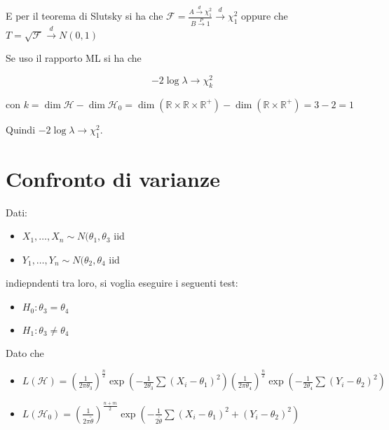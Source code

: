 \documentclass[hidelinks, 10pt]{report}
\begin{document}
\begin{es}
E per il teorema di Slutsky si ha che $ \mathcal{F} = \frac{A \stackrel{d}{\to} \chi^{2}_{1}}{B \stackrel{P}{\to} 1} \stackrel{d}{\to} \chi^{2}_{1} $ oppure che $ T = \sqrt{\mathcal{F}} \stackrel{d}{\to} N(0,1) $

Se uso il rapporto ML si ha che

\[ -2 \log \lambda \to \chi^{2}_{k} \]

con $ k = \dim \mathcal{H} - \dim \mathcal{H_{0}} = \dim (\mathbb{R} \times \mathbb{R} \times \mathbb{R}^{+}) - \dim (\mathbb{R} \times \mathbb{R}^{+}) = 3 - 2 = 1 $

Quindi $ - 2 \log \lambda \to \chi^{2}_{1} $.
\end{es}

\section{Confronto di varianze}

Dati:

\begin{itemize}
\item $ X_{1}, \dotsc, X_{n} \sim N(\theta_{1}, \theta_{3} $ iid
\item $ Y_{1}, \dotsc, Y_{n} \sim N(\theta_{2}, \theta_{4} $ iid
\end{itemize}

indiepndenti tra loro, si voglia eseguire i seguenti test:
\begin{itemize}
\item $ H_{0}: \theta_{3} = \theta_{4} $
\item $ H_{1}: \theta_{3} \ne \theta_{4} $
\end{itemize}

Dato che
\begin{itemize}
\item $ L(\mathcal{H}) = \left( \frac{1}{2 \pi \theta_{3}} \right)^{\frac{n}{2}} \exp \left( - \frac{1}{2 \theta_{3}} \sum (X_{i} - \theta_{1})^{2} \right) \left( \frac{1}{2 \pi \theta_{4}} \right)^{\frac{n}{2}} \exp \left( - \frac{1}{2 \theta_{4}} \sum (Y_{i} - \theta_{2})^{2} \right) $
\item $ L(\mathcal{H}_{0}) = \left( \frac{1}{2 \pi \tilde{\theta}} \right)^{\frac{n + m}{2}} \exp \left( - \frac{1}{2 \tilde{\theta}} \sum (X_{i} - \theta_{1})^{2} + (Y_{i} - \theta_{2})^{2} \right) $
\end{itemize}
\end{document}
